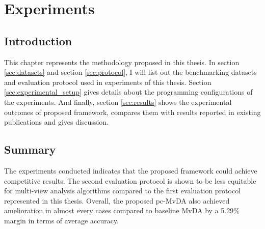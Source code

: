 
\chapter{Experiments} \label{chap:experimental_result}
    \section{Introduction}
        This chapter represents the methodology proposed in this thesis.
        In section \ref{sec:datasets} and section \ref{sec:protocol}, I will list out the benchmarking datasets and evaluation protocol used in experiments of this thesis.
        Section \ref{sec:experimental_setup} gives details about the programming configurations of the experiments.
        And finally, section \ref{sec:results} shows the experimental outcomes of proposed framework, compares them with results reported in existing publications and gives discussion.

    
    
    
    

    \section{Summary}
        The experiments conducted indicates that the proposed framework could achieve competitive results.
        The second evaluation protocol is shown to be less equitable for multi-view analysis algorithms compared to the first evaluation protocol represented in this thesis.
        Overall, the proposed pc-MvDA also achieved amelioration in almost every cases compared to baseline MvDA by a 5.29\% margin in terms of average accuracy.
